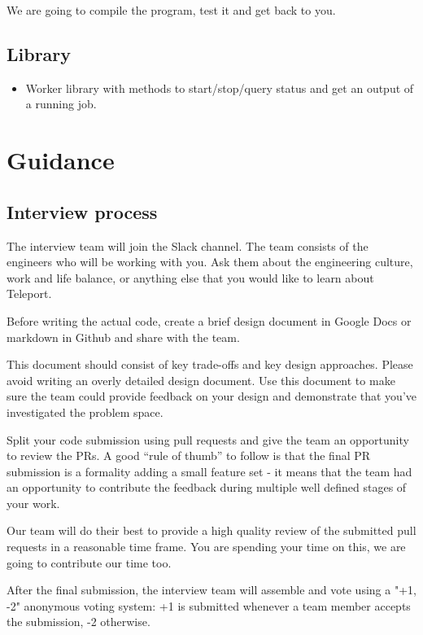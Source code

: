 \documentclass{article}
\begin{document}
  We are going to compile the program, test it and get back to you.
  
  \subsection*{Library}
  \begin{itemize} 
  \item[] Worker library with methods to start/stop/query status and get an output of a running job.
  \end{itemize}

\section{Guidance}

\subsection{Interview process}

The interview team will join the Slack channel. The team consists of the engineers who will be working with you.
Ask them about the engineering culture, work and life balance, or anything else that you would like to learn about Teleport.
  
Before writing the actual code, create a brief design document in Google Docs or markdown in Github and share with the team.

This document should consist of key trade-offs and key design approaches. Please avoid writing an overly detailed design document. Use this document to make sure the team could provide feedback on your design and demonstrate that you've investigated the problem space.

Split your code submission using pull requests and give the team an opportunity to review the PRs. A good “rule of thumb” to follow is that the final PR submission is a formality adding a small feature set - it means that the team had an opportunity to contribute the feedback during multiple well defined stages of your work.

Our team will do their best to provide a high quality review of the submitted pull requests in a reasonable time frame. You are spending your time on this, we are going to contribute our time too.

After the final submission, the interview team will assemble and vote using a "+1, -2" anonymous voting system: +1 is submitted whenever a team member accepts the submission, -2 otherwise.
\end{document}
